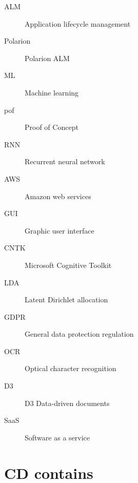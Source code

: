 \documentclass[thesis=M,english]{FITthesis}[2012/06/26]
\begin{document}
\begin{description}
	\item[ALM] Application lifecycle management
	\item[Polarion] Polarion ALM
	\item[ML] Machine learning 
	\item[pof] Proof of Concept
	\item[RNN] Recurrent neural network
	\item[AWS] Amazon web services
	\item[GUI] Graphic user interface
	\item[CNTK] Microsoft Cognitive Toolkit
	\item[LDA] Latent Dirichlet allocation
	\item[GDPR] General data protection regulation
	\item[OCR] Optical character recognition
	\item[D3] D3 Data-driven documents
	\item[SaaS] Software as a service
\end{description}

\chapter{CD contains}

\begin{figure}
\end{figure}
\end{document}

